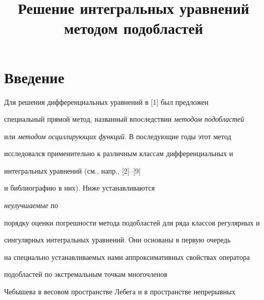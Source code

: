 

\title{Решение интегральных уравнений\\


методом подобластей}





\date{}




\pagestyle{plain} %







\maketitle


\label{begin}








\section*{Введение}





Для решения дифференциальных уравнений в [1] был предложен


специальный прямой метод, названный впоследствии {\it методом подобластей}


или {\it методом осциллирующих функций}. В последующие годы этот метод


исследовался применительно к различным классам дифференциальных и


интегральных уравнений (см., напр., [2]--[9]


и библиографию в них). Ниже устанавливаются


{\it неулучшаемые} по


порядку оценки погрешности метода подобластей для ряда классов регулярных и


сингулярных интегральных уравнений. Они основаны в первую очередь


на специально устанавливаемых нами аппроксимативных свойствах оператора


подобластей по экстремальным точкам многочленов


Чебышева в весовом пространстве Лебега и в пространстве непрерывных


